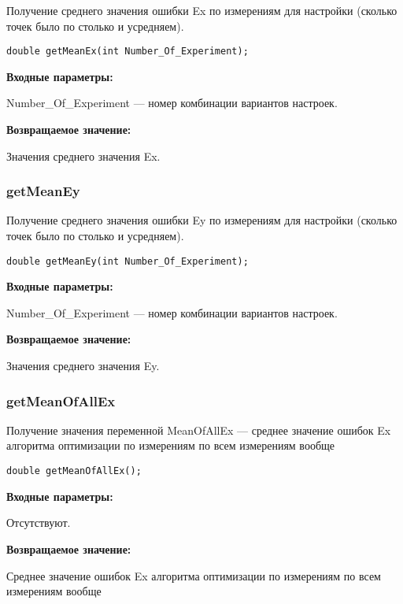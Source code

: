 \documentclass[a4paper,12pt]{article}
\begin{document}
Получение среднего значения ошибки Ex по измерениям для настройки (сколько точек было по столько и усредняем).


\begin{lstlisting}[label=code_syntax_getMeanEx,caption=Синтаксис]
double getMeanEx(int Number_Of_Experiment);
\end{lstlisting}

\textbf{Входные параметры:}

Number\_Of\_Experiment --- номер комбинации вариантов настроек.

\textbf{Возвращаемое значение:}

Значения среднего значения Ex.


\subsubsection{getMeanEy}\label{getMeanEy}

Получение среднего значения ошибки Ey по измерениям для настройки (сколько точек было по столько и усредняем).


\begin{lstlisting}[label=code_syntax_getMeanEy,caption=Синтаксис]
double getMeanEy(int Number_Of_Experiment);
\end{lstlisting}

\textbf{Входные параметры:}

Number\_Of\_Experiment --- номер комбинации вариантов настроек.

\textbf{Возвращаемое значение:}

Значения среднего значения Ey.


\subsubsection{getMeanOfAllEx}\label{getMeanOfAllEx}

Получение значения переменной MeanOfAllEx --- среднее значение ошибок Ex алгоритма оптимизации по измерениям по всем измерениям вообще


\begin{lstlisting}[label=code_syntax_getMeanOfAllEx,caption=Синтаксис]
double getMeanOfAllEx();
\end{lstlisting}

\textbf{Входные параметры:}

Отсутствуют.

\textbf{Возвращаемое значение:}

Среднее значение ошибок Ex алгоритма оптимизации по измерениям по всем измерениям вообще
\end{document}
